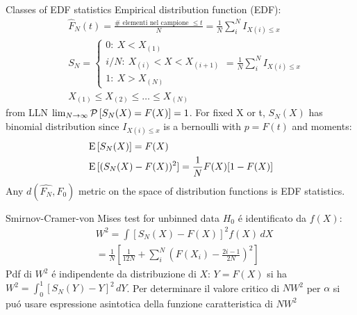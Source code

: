 \documentclass[asd-beamer.tex]{subfiles}
\begin{document}
\begin{frame}{Classes of EDF statistics}
	Empirical distribution function (EDF): 
	\begin{align*}
	&\hat{F}_N(t)=\frac{\#\text{ elementi nel campione }\leq t}{N}=\frac{1}{N}\sum_i^NI_{X(i)\leq x}\\
	&S_N=\left\{\begin{array}{l}0:\ X<X_{(1)}\\i/N:\ X_{(i)}<X<X_{(i+1)}\\1:\ X>X_{(N)}\end{array}\right.=\frac{1}{N}\sum_i^NI_{X(i)\leq x}\\
	&X_{(1)}\leq X_{(2)}\leq\ldots\leq X_{(N)}
	\end{align*}
from LLN $\lim_{N\to\infty}\operatorname{\mathcal{P}}{[S_N(X)=F(X)]}=1$. For fixed X or t, $S_N(X)$ has binomial distribution since $I_{X(i)\leq x}$ is a bernoulli with $p=F(t)$ and moments:
\begin{align*}
&\operatorname{E}{[S_N(X)]}=F(X)\\
&\operatorname{E}{[(S_N(X)-F(X))^2]}=\frac{1}{N}F(X)[1-F(X)]
\end{align*}
Any $d(\hat{F_N},F_0)$ metric on the space of distribution functions is EDF statistics.
\end{frame}

\begin{frame}{Smirnov-Cramer-von Mises test for unbinned data}
$H_0$ \'e identificato da $f(X)$:
\begin{align*}
&W^2=\int[S_N(X)-F(X)]^2f(X)\,dX\\
&=\frac{1}{N}[\frac{1}{12N}+\sum_i^N(F(X_i)-\frac{2i-1}{2N})^2]
\end{align*}
Pdf di $W^2$ \'e indipendente da distribuzione di $X$: $Y=F(X)$ si ha
$W^2=\int_0^1[S_N(Y)-Y]^2\,dY$.
Per determinare il valore critico di $NW^2$ per $\alpha$ si pu\'o usare espressione asintotica della funzione caratteristica di $NW^2$
\end{frame}
\end{document}
